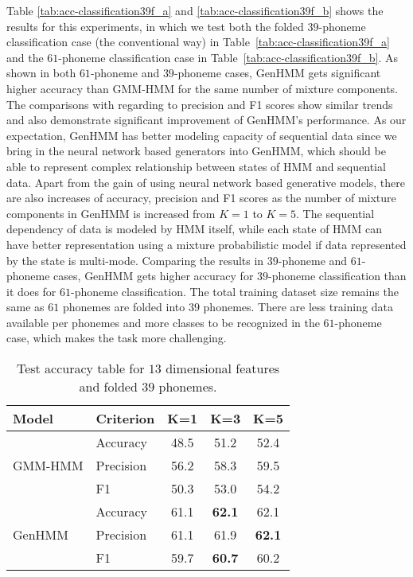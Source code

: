 Table \ref{tab:acc-classification39f_a} and \ref{tab:acc-classification39f_b} shows the results for this experiments, in which we test both the folded $39$-phoneme classification case (the conventional way) in Table~\ref{tab:acc-classification39f_a} and the $61$-phoneme classification case in Table~\ref{tab:acc-classification39f_b}. As shown in both $61$-phoneme and $39$-phoneme cases, GenHMM gets significant higher accuracy than GMM-HMM for the same number of mixture components. The comparisons with regarding to precision and F1 scores show similar trends and also demonstrate significant improvement of GenHMM's performance. As our expectation, GenHMM has better modeling capacity of sequential data since we bring in the neural network based generators into GenHMM, which should be able to represent complex relationship between states of HMM and sequential data. Apart from the gain of using neural network based generative models, there are also increases of accuracy, precision and F1 scores as the number of mixture components in GenHMM is increased from $K=1$ to $K=5$. The sequential dependency of data is modeled by HMM itself, while each state of HMM can have better representation using a mixture probabilistic model if data represented by the state is multi-mode. Comparing the results in $39$-phoneme and $61$-phoneme cases, GenHMM gets higher accuracy for $39$-phoneme classification than it does for $61$-phoneme classification. The total training dataset size remains the same as $61$ phonemes are folded into $39$ phonemes. There are less training data available per phonemes and more classes to be recognized in the $61$-phoneme case, which makes the task more challenging.

\begin{table}
  \caption{Test accuracy table for $13$ dimensional features and folded $39$ phonemes.}\label{tab:acc-classification13f_a}
  \centering  
  \begin{tabular}{llccc}
    \toprule
    {Model} & Criterion & K=1 &  K=3 &  K=5  \\  \midrule
    \multirow{3}{*}{GMM-HMM}
            & Accuracy & 48.5 &  51.2 &  52.4  \\
            & Precision& 56.2 &  58.3 &  59.5  \\
            & F1       & 50.3 &  53.0 &  54.2  \\
    \midrule
    \multirow{3}{*}{GenHMM}
            & Accuracy & 61.1 &  \textbf{62.1} &  62.1   \\ 
            & Precision& 61.1 &  61.9 &  \textbf{62.1}  \\
            & F1       & 59.7 &  \textbf{60.7} &  60.2  \\

    \bottomrule                                                                  
  \end{tabular}
\end{table}

